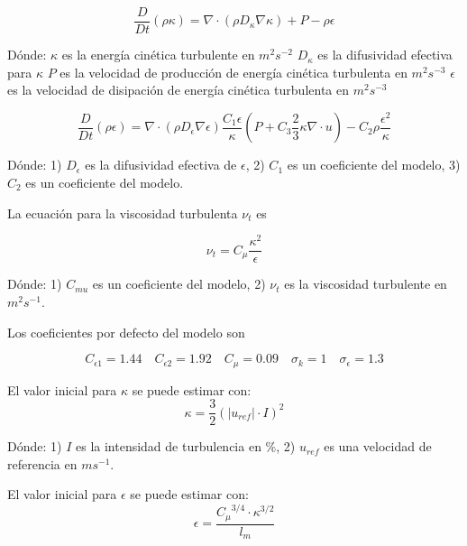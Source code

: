 \begin{equation}\label{eq:k}
  \frac{D}{Dt}(\rho \kappa) = \nabla \cdot (\rho D_{\kappa}\nabla \kappa) + P - \rho \epsilon
\end{equation}

Dónde:
$\kappa$ es la energía cinética turbulente en $m^{2}s^{-2}$
$D_{\kappa}$ es la difusividad efectiva para $\kappa$
$P$ es la velocidad de producción de energía cinética turbulenta en $m^{2}s^{-3}$
$\epsilon$ es la velocidad de disipación de energía cinética turbulenta en $m^{2}s^{-3}$


\begin{equation}\label{eq:k}
  \frac{D}{Dt}(\rho \epsilon) = \nabla \cdot (\rho D_{\epsilon}\nabla \epsilon) \frac{C_{1}\epsilon}{\kappa} \left( P+C_{3}\frac{2}{3}\kappa\nabla\cdot u \right) - C_{2}\rho\frac{\epsilon^{2}}{\kappa}
\end{equation}

Dónde: 1) $D_{\epsilon}$ es la difusividad efectiva de $\epsilon$, 2) $C_{1}$ es
un coeficiente del modelo, 3) $C_{2}$ es un coeficiente del modelo.

La ecuación para la viscosidad turbulenta $\nu_{t}$ es

\begin{equation}
  \nu_{t} = C_{\mu}\frac{\kappa^{2}}{\epsilon}
\end{equation}

Dónde: 1) $C_{mu}$ es un coeficiente del modelo, 2) $\nu_{t}$ es la viscosidad
turbulente en $m^{2}s^{-1}$.

Los coeficientes por defecto del modelo son

\begin{equation}
  C_{\epsilon 1}=1.44
  \quad
  C_{\epsilon 2}=1.92
  \quad
  C_{\mu}=0.09
  \quad
  \sigma_{k}=1
  \quad
  \sigma_{\epsilon}=1.3
\end{equation}

El valor inicial para $\kappa$ se puede estimar con:
\begin{equation}
  \kappa = \frac{3}{2} {\left( |u_{ref}| \cdot I \right)}^{2}
\end{equation}

Dónde: 1) $I$ es la intensidad de turbulencia en \%, 2) $u_{ref}$ es una
velocidad de referencia en $ms^{-1}$.

El valor inicial para $\epsilon$ se puede estimar con:
\begin{equation}
  \epsilon = \frac{{C_{\mu}}^{3/4} \cdot {\kappa}^{3/2}} {l_{m}}
\end{equation}

